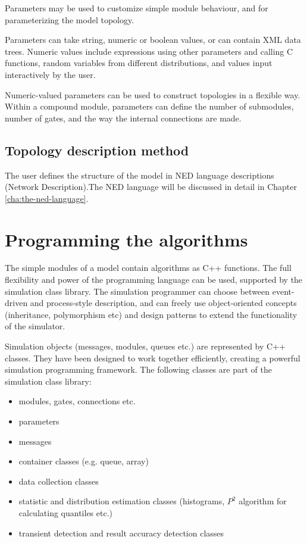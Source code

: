 Parameters may be used to customize simple module behaviour,
and for parameterizing the model topology.

Parameters can take string, numeric or boolean values, or can
contain XML data trees. Numeric values include expressions using
other parameters and calling C functions, random variables from
different distributions, and values input interactively by the user.

Numeric-valued parameters can be used to construct topologies in a
flexible way. Within a compound module, parameters can define the
number of submodules, number of gates, and the way the internal
connections are made.


\subsection{Topology description method}
The user defines the structure of the model in NED language descriptions
(Network Description).The NED language will be discussed in detail
in Chapter \ref{cha:the-ned-language}.


\section{Programming the algorithms}

The simple modules of a model contain algorithms
as C++ functions.
The full flexibility and power of the programming language can
be used, supported by the {\opp} simulation class library.
The simulation programmer can choose between event-driven and process-style
description, and can freely use object-oriented concepts
(inheritance, polymorphism etc) and design patterns to extend the
functionality of the simulator.

Simulation objects (messages, modules, queues etc.) are represented
by C++ classes. They have been designed to work together efficiently,
creating a powerful simulation programming framework.
The following classes are part of the simulation class library:

\begin{itemize}
  \item{modules, gates, connections etc.}
  \item{parameters}
  \item{messages}
  \item{container classes (e.g. queue, array)}
  \item{data collection classes}
  \item{statistic and distribution estimation classes (histograms, $P^2$
  algorithm for calculating quantiles etc.)}
  \item{transient detection and result accuracy detection classes}
\end{itemize}

